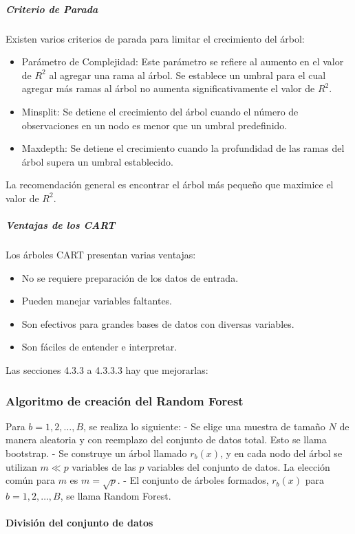 {\subparagraph{Criterio de Parada}
Existen varios criterios de parada para limitar el crecimiento del árbol:
\begin{itemize}
	\item Parámetro de Complejidad: Este parámetro se refiere al aumento en el valor de \(R^2\) al agregar una rama al árbol. Se establece un umbral para el cual agregar más ramas al árbol no aumenta significativamente el valor de \(R^2\).
	\item Minsplit: Se detiene el crecimiento del árbol cuando el número de observaciones en un nodo es menor que un umbral predefinido.
	\item Maxdepth: Se detiene el crecimiento cuando la profundidad de las ramas del árbol supera un umbral establecido.
\end{itemize}
La recomendación general es encontrar el árbol más pequeño que maximice el valor de \(R^2\).

\subparagraph{Ventajas de los CART}
Los árboles CART presentan varias ventajas:
\begin{itemize}
	\item No se requiere preparación de los datos de entrada.
	\item Pueden manejar variables faltantes.
	\item Son efectivos para grandes bases de datos con diversas variables.
	\item Son fáciles de entender e interpretar.
\end{itemize}

{\color{blue} Las secciones 4.3.3 a 4.3.3.3 hay que mejorarlas:}

\subsubsection{Algoritmo de creación del Random Forest}

Para \(b = 1,2, \ldots, B\), se realiza lo siguiente:
- Se elige una muestra de tamaño \(N\) de manera aleatoria y con reemplazo del conjunto de datos total. Esto se llama bootstrap.
- Se construye un árbol llamado \(r_b(x)\), y en cada nodo del árbol se utilizan \(m \ll p\) variables de las \(p\) variables del conjunto de datos. La elección común para \(m\) es \(m = \sqrt{p}\).
- El conjunto de árboles formados, \(r_b(x)\) para \(b = 1,2, \ldots, B\), se llama Random Forest.

\paragraph{División del conjunto de datos}

}
